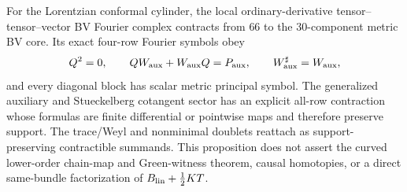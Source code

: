 \begin{proposition}
For the Lorentzian conformal cylinder, the local
ordinary-derivative tensor--tensor--vector BV Fourier complex
contracts from $66$ to the $30$-component metric BV core.
Its exact four-row Fourier symbols obey
\[Q^2=0,\qquad QW_{\rm aux}+W_{\rm aux}Q=P_{\rm aux},\qquad
W_{\rm aux}^{\sharp}=W_{\rm aux},\]
and every diagonal block has scalar metric principal symbol.
The generalized auxiliary and Stueckelberg cotangent sector
has an explicit all-row contraction whose formulas are finite
differential or pointwise maps and therefore preserve support.
The trace/Weyl and nonminimal doublets reattach as
support-preserving contractible summands.  This proposition does
not assert the curved lower-order chain-map and Green-witness
theorem, causal homotopies, or a direct same-bundle factorization of
$B_{\rm lin}+\frac12KT$.
\end{proposition}
